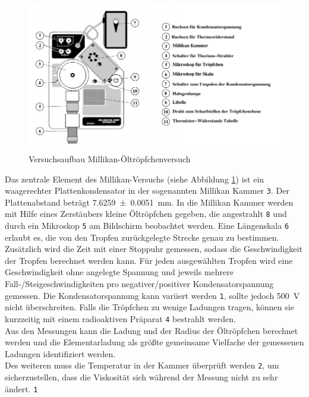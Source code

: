 \begin{figure}[h!]
	\centering
	\includegraphics[width=\textwidth]{Versuchsaufbau.png}
	\caption[Versuchsaufbau Millikan-Öltröpfchenversuch]{Versuchsaufbau Millikan-Öltröpfchenversuch\footnotemark}
	\label{fig:versuchsaufbau}
\end{figure}


Das zentrale Element des Millikan-Versuchs (siehe Abbildung \ref{fig:versuchsaufbau}) ist ein waagerechter Plattenkondensator in der sogenannten Millikan Kammer {\large\textcircled{\normalsize \texttt{3}}}. Der Plattenabstand beträgt \SI{7.6259+-0.0051}{\milli\meter}. In die Millikan Kammer werden mit Hilfe eines Zerstäubers kleine Öltröpfchen gegeben, die angestrahlt {\large\textcircled{\normalsize \texttt{8}}} und durch ein Mikroskop {\large\textcircled{\normalsize \texttt{5}}} am Bildschirm beobachtet werden. Eine Längenskala {\large\textcircled{\normalsize \texttt{6}}} erlaubt es, die von den Tropfen zurückgelegte Strecke genau zu bestimmen. Zusätzlich wird die Zeit mit einer Stoppuhr gemessen, sodass die Geschwindigkeit der Tropfen berechnet werden kann. Für jeden ausgewählten Tropfen wird eine Geschwindigkeit ohne angelegte Spannung und jeweils mehrere Fall-/Steigeschwindigkeiten pro negativer/positiver Kondensatorspannung gemessen. Die Kondensatorspannung kann variiert werden {\large\textcircled{\normalsize \texttt{1}}}, sollte jedoch \SI{500}{\volt} nicht überschreiten. Falls die Tröpfchen zu wenige Ladungen tragen, können sie kurzzeitig mit einem radioaktiven Präparat {\large\textcircled{\normalsize \texttt{4}}} bestrahlt werden. \\
Aus den Messungen kann die Ladung und der Radius der Öltröpfchen berechnet werden und die Elementarladung als größte gemeinsame Vielfache der gemessenen Ladungen identifiziert werden. \\
Des weiteren muss die Temperatur in der Kammer überprüft werden {\large\textcircled{\normalsize \texttt{2}}}, um sicherzustellen, dass die Viskosität sich während der Messung nicht zu sehr ändert.
{\large\textcircled{\normalsize \texttt{1}}}